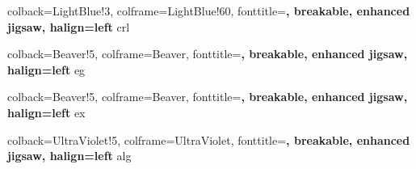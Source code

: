 %
{	colback=LightBlue!3, 
	colframe=LightBlue!60, 
	fonttitle=\bfseries, 
	breakable, 
	enhanced jigsaw, 
	halign=left
}{crl}

%
{	colback=Beaver!5, 
	colframe=Beaver, 
	fonttitle=\bfseries, 
	breakable, 
	enhanced jigsaw, 
	halign=left
}{eg}

%
{	colback=Beaver!5, 
	colframe=Beaver, 
	fonttitle=\bfseries, 
	breakable, 
	enhanced jigsaw, 
	halign=left
}{ex}

%
{	colback=UltraViolet!5, 
	colframe=UltraViolet, 
	fonttitle=\bfseries, 
	breakable, 
	enhanced jigsaw, 
	halign=left
}{alg}




\hypersetup{
    colorlinks=true, %
    linktoc=all,     %
    linkcolor=DarkBlue,  %
}
